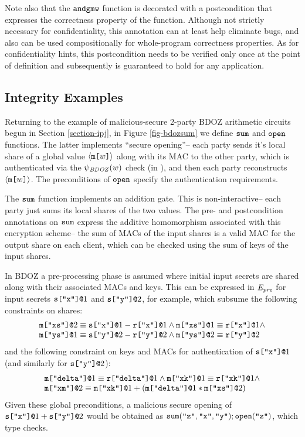 Note also that the $\texttt{andgmw}$ function is decorated with a
postcondition that expresses the correctness property of the
function. Although not strictly necessary for confidentiality, this
annotation can at least help eliminate bugs, and also can be used
compositionally for whole-program correctness properties. As for
confidentiality hints, this postcondition needs to be verified only
once at the point of definition and subsequently is guaranteed to hold
for any application.

\subsection{Integrity Examples}



Returning to the example of malicious-secure 2-party BDOZ arithmetic
circuits begun in Section \ref{section-ipj}, in Figure \ref{fig-bdozsum} we
define $\texttt{sum}$ and $\texttt{open}$ functions. The latter implements
``secure opening''-- each party sends it's local share of a
global value $\langle \texttt{m[}w\texttt{]} \rangle$ along with its MAC to the other party,
which is authenticated via the $\psi_{\mathit{BDOZ}}(w)$ check (in ),
and then each party reconstructs $\langle \texttt{m[}w\texttt{]} \rangle$. The preconditions
of $\texttt{open}$ specify the authentication requirements. 

The $\texttt{sum}$ function implements an addition gate. This is
non-interactive-- each party just sums its local shares
of the two values. The pre- and postcondition annotations
on $\texttt{sum}$ express the additive homomorphism associated
with this encryption scheme-- the sum of MACs of the input
shares is a valid MAC for the output share on each client,
which can be checked using the sum of keys of the input shares.

In BDOZ a pre-processing phase is assumed where initial input secrets
are shared along with their associated MACs and keys. This can be
expressed in $\mathit{E}_{\mathit{pre}}$ for input secrets $\texttt{s[}\texttt{"x"}\texttt{]}\texttt{@}1$ and
$\texttt{s[}\texttt{"y"}\texttt{]}\texttt{@}2$, for example, which subsume the following
constraints on shares:
{\footnotesize$$
\begin{array}{l}
\texttt{m[}\texttt{"xs"}\texttt{]}\texttt{@}2 \equiv \texttt{s[}\texttt{"x"}\texttt{]}\texttt{@}1 - \texttt{r[}\texttt{"x"}\texttt{]}\texttt{@}1 \wedge 
\texttt{m[}\texttt{"xs"}\texttt{]}\texttt{@}1 \equiv \texttt{r[}\texttt{"x"}\texttt{]}\texttt{@}1 \wedge \\
\texttt{m[}\texttt{"ys"}\texttt{]}\texttt{@}1 \equiv \texttt{s[}\texttt{"y"}\texttt{]}\texttt{@}2 - \texttt{r[}\texttt{"y"}\texttt{]}\texttt{@}2 \wedge 
\texttt{m[}\texttt{"ys"}\texttt{]}\texttt{@}2 \equiv \texttt{r[}\texttt{"y"}\texttt{]}\texttt{@}2 
\end{array}
$$}
and the following constraint on keys and MACs for authentication
of $\texttt{s[}\texttt{"x"}\texttt{]}\texttt{@}1$ (and similarly for $\texttt{s[}\texttt{"y"}\texttt{]}\texttt{@}2$):
{\footnotesize$$
\begin{array}{l}
\texttt{m[}\texttt{"delta"}\texttt{]}\texttt{@}1 \equiv \texttt{r[}\texttt{"delta"}\texttt{]}\texttt{@}1 \wedge
\texttt{m[}\texttt{"xk"}\texttt{]}\texttt{@}1 \equiv \texttt{r[}\texttt{"xk"}\texttt{]}\texttt{@}1 \wedge\\
\texttt{m[}\texttt{"xm"}\texttt{]}\texttt{@}2 \equiv \texttt{m[}\texttt{"xk"}\texttt{]}\texttt{@}1 + (\texttt{m[}\texttt{"delta"}\texttt{]}\texttt{@}1 * \texttt{m[}\texttt{"xs"}\texttt{]}\texttt{@}2)
\end{array}
$$}
Given these global preconditions, a malicious secure opening of $\texttt{s[}\texttt{"x"}\texttt{]}\texttt{@}1 +
\texttt{s[}\texttt{"y"}\texttt{]}\texttt{@}2$ would be obtained as
$\texttt{sum}(\texttt{"z"},\texttt{"x"},\texttt{"y"}); \texttt{open}(\texttt{"z"})$,
which type checks.

